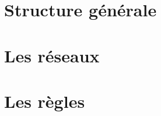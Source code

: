 \documentclass[11pt]{article}
\begin{document}
\maketitle

\section{Structure g\'en\'erale}


\section{Les r\'eseaux}


\section{Les r\`egles}



\clearpage


\end{document}
